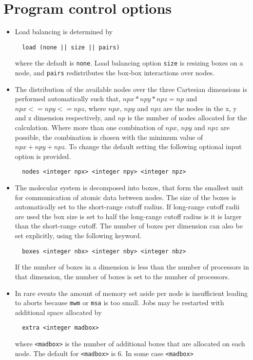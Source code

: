 \section{Program control options}
\begin{itemize}
\item
Load balancing is determined by
\begin{verbatim}
  load (none || size || pairs)
\end{verbatim}
where the default is {\tt none}. Load balancing option {\tt size}
is resizing boxes on a node, and {\tt pairs} redistributes the
box-box interactions over nodes.
\item
The distribution of the available nodes over the three Cartesian
dimensions is performed automatically such that, $npx*npy*npz=np$
and $npx<=npy<=npz$, where $npx$, $npy$ and $npz$ are the nodes in the
x, y and z dimension respectively, and $np$ is the number of nodes
allocated for the calculation. Where more than one combination
of $npx$, $npy$ and $npz$ are possible, the combination is chosen with
the minimum value of $npx+npy+npz$. To change the default setting
the following optional input option is provided.
\begin{verbatim}
  nodes <integer npx> <integer npy> <integer npz>
\end{verbatim}
\item
The molecular system is decomposed into boxes, that form the smallest
unit for communication of atomic data between nodes. The size of the
boxes is automatically set to the short-range cutoff radius. If
long-range cutoff radii  are used the box size is set to half the
long-range cutoff radius is it is larger than the short-range cutoff.
The number of boxes per dimension can also be set explicitly, using
the following keyword.
\begin{verbatim}
  boxes <integer nbx> <integer nby> <integer nbz>
\end{verbatim}
If the number of boxes in a dimension is less than the number of
processors in that dimension, the number of boxes is set to the number
of processors.
\item
In rare events the amount of memory set aside per node is insufficient
leading to aborts because {\tt mwm} or {\tt msa} is too small. Jobs
may be restarted with additional space allocated by
\begin{verbatim}
  extra <integer madbox>
\end{verbatim}
where \verb+<madbox>+ is the number of additional boxes that are allocated
on each node. The default for \verb+<madbox>+ is 6. In some case \verb+<madbox>+

\end{itemize}
